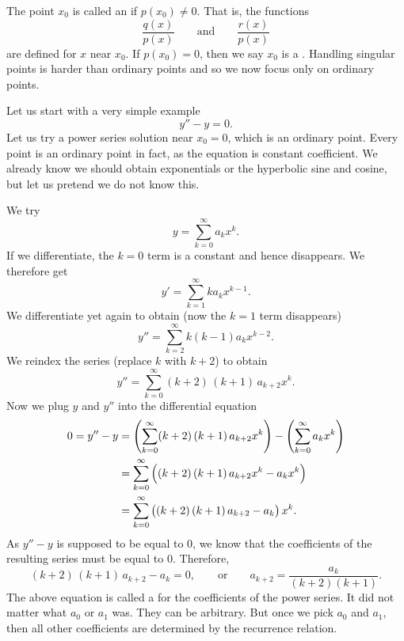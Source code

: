 The point $x_0$ is called an \emph{}
if $p(x_0) \not= 0$.  That is, the functions
\begin{equation*}
\frac{q(x)}{p(x)} \qquad \text{and} \qquad \frac{r(x)}{p(x)}
\end{equation*}
are defined for $x$ near $x_0$.  If $p(x_0) = 0$, then we say $x_0$
is a \emph{}.  Handling singular points is
harder than ordinary points and so we now focus only on ordinary points.

\begin{example}
Let us start with a very simple example
\begin{equation*}
y'' - y = 0 .
\end{equation*}
Let us try a power series solution near $x_0 = 0$,
which is an ordinary point.  Every point is an ordinary
point in fact, as the equation is constant coefficient.  We already know
we should obtain exponentials or the hyperbolic sine and cosine,
but let us pretend we do not know this.

We try
\begin{equation*}
y = \sum_{k=0}^\infty a_k x^k .
\end{equation*}
If we differentiate, the $k=0$ term is a constant and hence disappears.
We therefore get
\begin{equation*}
y' = \sum_{k=1}^\infty k a_k x^{k-1} .
\end{equation*}
We differentiate yet again to obtain (now the $k=1$ term disappears)
\begin{equation*}
y'' = \sum_{k=2}^\infty k(k-1) a_k x^{k-2} .
\end{equation*}
We reindex the series (replace $k$ with $k+2$) to obtain
\begin{equation*}
y'' = \sum_{k=0}^\infty (k+2)\,(k+1) \, a_{k+2} x^k .
\end{equation*}
Now we plug $y$ and $y''$ into the differential equation
\begin{equation*}
\begin{split}
0 = y''-y & = 
\Biggl( \sum_{k=0}^\infty (k+2)\,(k+1) \, a_{k+2} x^k  \Biggr)
-
\Biggl( \sum_{k=0}^\infty a_k x^k \Biggr)
\\
& =
\sum_{k=0}^\infty \,\Bigl( (k+2)\,(k+1) \, a_{k+2} x^k 
-
a_k x^k \Bigr)
\\
& =
\sum_{k=0}^\infty \,\bigl( (k+2)\,(k+1) \,a_{k+2} - a_k \bigr) \, x^k  .
\end{split}
\end{equation*}
As $y'' - y$ is supposed to be equal to 0, we know that the
coefficients of the resulting series must be equal to 0.  Therefore,
\begin{equation*}
(k+2)\,(k+1) \,a_{k+2} - a_k = 0 ,
\qquad
\text{or}
\qquad
a_{k+2} = \frac{a_k}{(k+2)(k+1)} .
\end{equation*}
The above equation is called a \emph{}
for the coefficients of the power series.
It did not matter what $a_0$ or $a_1$ was.  They can be arbitrary.
But once we pick $a_0$ and $a_1$, then all other coefficients are
determined by the recurrence relation.


\end{example}
